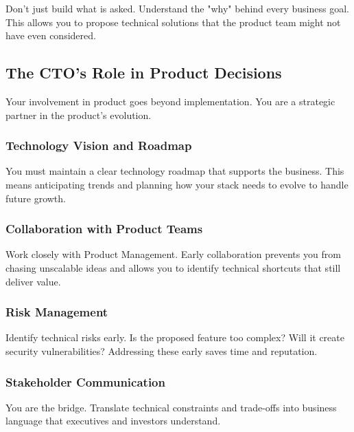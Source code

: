 \begin{tipbox}
    Don't just build what is asked. Understand the "why" behind every business goal. This allows you to propose technical solutions that the product team might not have even considered.
\end{tipbox}

\subsection{The CTO's Role in Product Decisions}

Your involvement in product goes beyond implementation. You are a strategic partner in the product's evolution.

\subsubsection{Technology Vision and Roadmap}
You must maintain a clear technology roadmap that supports the business. This means anticipating trends and planning how your stack needs to evolve to handle future growth.

\subsubsection{Collaboration with Product Teams}
Work closely with Product Management. Early collaboration prevents you from chasing unscalable ideas and allows you to identify technical shortcuts that still deliver value.

\subsubsection{Risk Management}
Identify technical risks early. Is the proposed feature too complex? Will it create security vulnerabilities? Addressing these early saves time and reputation.

\subsubsection{Stakeholder Communication}
You are the bridge. Translate technical constraints and trade-offs into business language that executives and investors understand.
